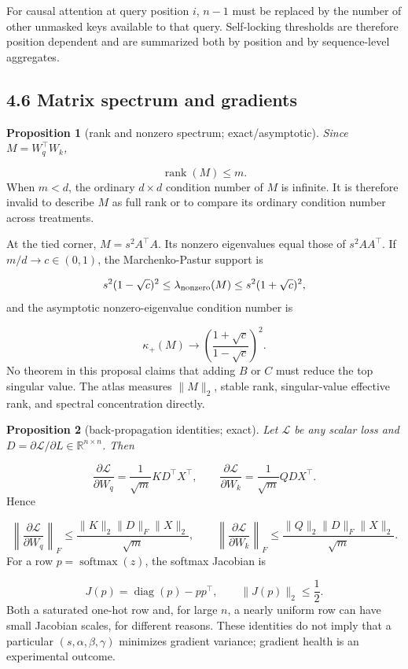 \documentclass[11pt,letterpaper]{article}
\newtheorem{proposition}{Proposition}[section]
\theoremstyle{definition}
\begin{document}
For causal attention at query position $i$, $n-1$ must be replaced by the number of other unmasked keys available to that query. Self-locking thresholds are therefore position dependent and are summarized both by position and by sequence-level aggregates.

\subsection{4.6 Matrix spectrum and gradients}
\begin{proposition}[rank and nonzero spectrum; exact/asymptotic]
Since $M=W_q^\top W_k$,
\end{proposition}
\[
\operatorname{rank}(M)\le m.
\]
When $m<d$, the ordinary $d\times d$ condition number of $M$ is infinite. It is therefore invalid to describe $M$ as full rank or to compare its ordinary condition number across treatments.

At the tied corner, $M=s^2A^\top A$. Its nonzero eigenvalues equal those of $s^2AA^\top$. If $m/d\to c\in(0,1)$, the Marchenko-Pastur support is

\[
s^2(1-\sqrt c)^2
\le\lambda_{\rm nonzero}(M)
\le s^2(1+\sqrt c)^2,
\]
and the asymptotic nonzero-eigenvalue condition number is

\[
\kappa_+(M)\longrightarrow
\left(\frac{1+\sqrt c}{1-\sqrt c}\right)^2.
\]
No theorem in this proposal claims that adding $B$ or $C$ must reduce the top singular value. The atlas measures $\|M\|_2$, stable rank, singular-value effective rank, and spectral concentration directly.

\begin{proposition}[back-propagation identities; exact]
Let $\mathcal L$ be any scalar loss and $D=\partial\mathcal L/\partial L\in\mathbb R^{n\times n}$. Then
\end{proposition}
\[
\frac{\partial\mathcal L}{\partial W_q}
=\frac1{\sqrt m}KD^\top X^\top,\qquad
\frac{\partial\mathcal L}{\partial W_k}
=\frac1{\sqrt m}QD X^\top.
\]
Hence

\[
\left\|\frac{\partial\mathcal L}{\partial W_q}\right\|_F
\le\frac{\|K\|_2\|D\|_F\|X\|_2}{\sqrt m},
\qquad
\left\|\frac{\partial\mathcal L}{\partial W_k}\right\|_F
\le\frac{\|Q\|_2\|D\|_F\|X\|_2}{\sqrt m}.
\]
For a row $p=\operatorname{softmax}(z)$, the softmax Jacobian is

\[
J(p)=\operatorname{diag}(p)-pp^\top,\qquad \|J(p)\|_2\le\frac12.
\]
Both a saturated one-hot row and, for large $n$, a nearly uniform row can have small Jacobian scales, for different reasons. These identities do not imply that a particular $(s,\alpha,\beta,\gamma)$ minimizes gradient variance; gradient health is an experimental outcome.
\end{document}
